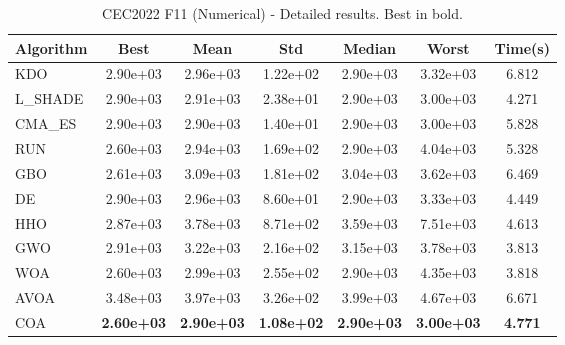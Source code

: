 \begin{table}[H]
\centering\small
\caption{CEC2022 F11 (Numerical) - Detailed results. Best in bold.}
\label{tab:cec2022_F11}
\begin{tabular}{lcccccc}
\toprule
\textbf{Algorithm} & \textbf{Best} & \textbf{Mean} & \textbf{Std} & \textbf{Median} & \textbf{Worst} & \textbf{Time(s)} \\
\midrule
KDO & 2.90e+03 & 2.96e+03 & 1.22e+02 & 2.90e+03 & 3.32e+03 & 6.812 \\
L_SHADE & 2.90e+03 & 2.91e+03 & 2.38e+01 & 2.90e+03 & 3.00e+03 & 4.271 \\
CMA_ES & 2.90e+03 & 2.90e+03 & 1.40e+01 & 2.90e+03 & 3.00e+03 & 5.828 \\
RUN & 2.60e+03 & 2.94e+03 & 1.69e+02 & 2.90e+03 & 4.04e+03 & 5.328 \\
GBO & 2.61e+03 & 3.09e+03 & 1.81e+02 & 3.04e+03 & 3.62e+03 & 6.469 \\
DE & 2.90e+03 & 2.96e+03 & 8.60e+01 & 2.90e+03 & 3.33e+03 & 4.449 \\
HHO & 2.87e+03 & 3.78e+03 & 8.71e+02 & 3.59e+03 & 7.51e+03 & 4.613 \\
GWO & 2.91e+03 & 3.22e+03 & 2.16e+02 & 3.15e+03 & 3.78e+03 & 3.813 \\
WOA & 2.60e+03 & 2.99e+03 & 2.55e+02 & 2.90e+03 & 4.35e+03 & 3.818 \\
AVOA & 3.48e+03 & 3.97e+03 & 3.26e+02 & 3.99e+03 & 4.67e+03 & 6.671 \\
COA & \textbf{2.60e+03} & \textbf{2.90e+03} & \textbf{1.08e+02} & \textbf{2.90e+03} & \textbf{3.00e+03} & \textbf{4.771} \\
\bottomrule
\end{tabular}
\end{table}
